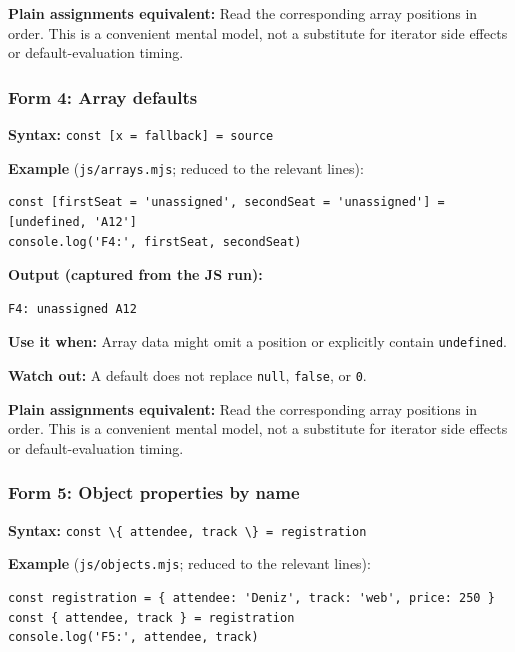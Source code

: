 \documentclass[
  10pt,
]{article}
\newcommand{\passthrough}[1]{#1}
\begin{document}
\textbf{Plain assignments equivalent:} Read the corresponding array
positions in order. This is a convenient mental model, not a substitute
for iterator side effects or default-evaluation timing.

\subsubsection{Form 4: Array defaults}\label{form-4-array-defaults}

\textbf{Syntax:} \passthrough{\lstinline!const [x = fallback] = source!}

\textbf{Example} (\passthrough{\lstinline!js/arrays.mjs!}; reduced to
the relevant lines):

\begin{lstlisting}
const [firstSeat = 'unassigned', secondSeat = 'unassigned'] = [undefined, 'A12']
console.log('F4:', firstSeat, secondSeat)
\end{lstlisting}

\textbf{Output (captured from the JS run):}

\begin{lstlisting}
F4: unassigned A12
\end{lstlisting}

\textbf{Use it when:} Array data might omit a position or explicitly
contain \passthrough{\lstinline!undefined!}.

\textbf{Watch out:} A default does not replace
\passthrough{\lstinline!null!}, \passthrough{\lstinline!false!}, or
\passthrough{\lstinline!0!}.

\textbf{Plain assignments equivalent:} Read the corresponding array
positions in order. This is a convenient mental model, not a substitute
for iterator side effects or default-evaluation timing.

\subsubsection{Form 5: Object properties by
name}\label{form-5-object-properties-by-name}

\textbf{Syntax:}
\passthrough{\lstinline!const \{ attendee, track \} = registration!}

\textbf{Example} (\passthrough{\lstinline!js/objects.mjs!}; reduced to
the relevant lines):

\begin{lstlisting}
const registration = { attendee: 'Deniz', track: 'web', price: 250 }
const { attendee, track } = registration
console.log('F5:', attendee, track)
\end{lstlisting}
\end{document}
